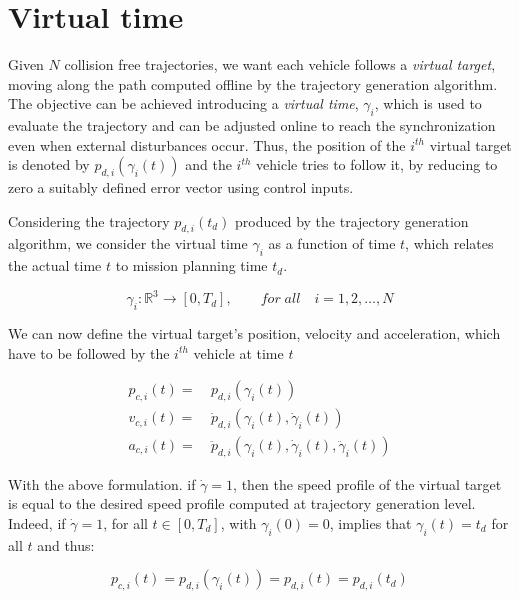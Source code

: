 \section{Virtual time\label{sec:virtual_time}}

Given $ N $ collision free trajectories, we want each vehicle follows a \textit{virtual target},
moving along the path computed offline by the trajectory generation algorithm.
The objective can be achieved introducing a \textit{virtual time}, $ \gamma_i $,
which is used to evaluate the trajectory and can be adjusted online to reach
the synchronization even when external disturbances occur.
Thus, the position of the $ i^{th} $ virtual target is denoted by $ p_{d,i} ( \gamma_i (t))$
and the $ i^{th} $ vehicle tries to follow it, by reducing to zero a suitably defined
error vector using control inputs.

Considering the trajectory $ p_{d,i} (t_d) $ produced by the trajectory generation
algorithm, we consider the virtual time $ \gamma_i $ as a function of time $ t $,
which relates the actual time $t$ to mission planning time $t_d$.

\begin{equation}  \label{eq:virt_time_func}
  \gamma_i : \mathbb{R}^3 \rightarrow [0, T_d], \qquad for \; all \quad i = 1,2,\dots,N
\end{equation}

We can now define the virtual target's position, velocity and acceleration, which
have to be followed by the $ i^{th}$ vehicle at time $t$

\begin{equation}  \label{eq:pos_vel_acc_def}
  \begin{aligned}
  p_{c,i}(t) = \ & p_{d,i}(\gamma_i(t)) \\
  v_{c,i}(t) = \ & \dot{p}_{d,i} (\gamma_i(t), \dot{\gamma}_i (t)) \\
  a_{c,i}(t) = \ & \ddot{p}_{d,i} (\gamma_i(t), \dot{\gamma}_i(t), \ddot{\gamma}_i(t))
  \end{aligned}
\end{equation}

With the above formulation. if $ \dot{\gamma} = 1$, then the speed profile of
the virtual target is equal to the desired speed profile computed at trajectory
generation level.
Indeed, if $ \dot{\gamma} = 1$, for all $t \in [0, T_d]$, with $\gamma_i(0) = 0$,
implies that $\gamma_i(t) = t_d$ for all $t$ and thus:

\begin{equation*}
  p_{c,i}(t) = p_{d,i}(\gamma_i(t)) = p_{d,i}(t) = p_{d,i} (t_d)
\end{equation*}

